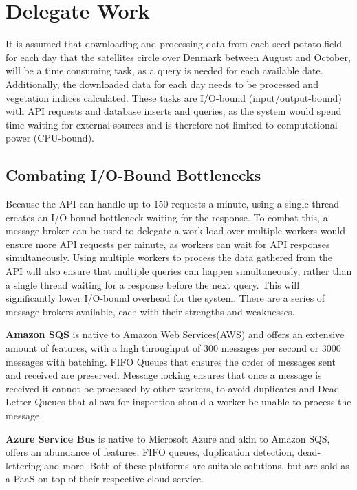 \section{Delegate Work}
\label{Sec:DelegateWork}
It is assumed that downloading and processing data from each seed potato field for each day that the satellites circle over Denmark between August and October, will be a time consuming task, as a query is needed for each available date. Additionally, the downloaded data for each day needs to be processed and vegetation indices calculated. These tasks are I/O-bound (input/output-bound) with API requests and database inserts and queries, as the system would spend time waiting for external sources and is therefore not limited to computational power (CPU-bound)\cite{baeldung_cpu_io_bound}.

\subsection{Combating I/O-Bound Bottlenecks}
Because the API can handle up to 150 requests a minute, using a single thread creates an I/O-bound bottleneck waiting for the response. To combat this, a message broker can be used to delegate a work load over multiple workers would ensure more API requests per minute, as workers can wait for API responses simultaneously. Using multiple workers to process the data gathered from the API will also ensure that multiple queries can happen simultaneously, rather than a single thread waiting for a response before the next query. This will significantly lower I/O-bound overhead for the system.
There are a series of message brokers available, each with their strengths and weaknesses.

\textbf{Amazon SQS} is native to Amazon Web Services(AWS) and offers an extensive amount of features, with a high throughput of 300 messages per second or 3000 messages with batching. FIFO Queues that ensures the order of messages sent and received are preserved. Message locking ensures that once a message is received it cannot be processed by other workers, to avoid duplicates and Dead Letter Queues that allows for inspection should a worker be unable to process the message\cite{aws_sqs_features}.

\textbf{Azure Service Bus} is native to Microsoft Azure and akin to Amazon SQS, offers an abundance of features. FIFO queues, duplication detection, dead-lettering and more\cite{azure_service_bus_overview}.
Both of these platforms are suitable solutions, but are sold as a PaaS on top of their respective cloud service.

